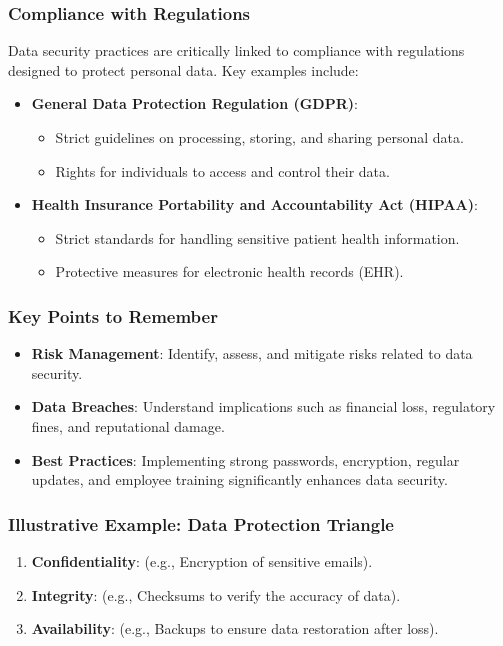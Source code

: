 \documentclass{beamer}
\begin{document}
\begin{frame}[fragile]
    \frametitle{Compliance with Regulations}
    Data security practices are critically linked to compliance with regulations designed to protect personal data. Key examples include:
    \begin{itemize}
        \item \textbf{General Data Protection Regulation (GDPR)}: 
        \begin{itemize}
            \item Strict guidelines on processing, storing, and sharing personal data.
            \item Rights for individuals to access and control their data.
        \end{itemize}
        \item \textbf{Health Insurance Portability and Accountability Act (HIPAA)}: 
        \begin{itemize}
            \item Strict standards for handling sensitive patient health information.
            \item Protective measures for electronic health records (EHR).
        \end{itemize}
    \end{itemize}
\end{frame}

\begin{frame}[fragile]
    \frametitle{Key Points to Remember}
    \begin{itemize}
        \item \textbf{Risk Management}: Identify, assess, and mitigate risks related to data security.
        \item \textbf{Data Breaches}: Understand implications such as financial loss, regulatory fines, and reputational damage.
        \item \textbf{Best Practices}: Implementing strong passwords, encryption, regular updates, and employee training significantly enhances data security.
    \end{itemize}
\end{frame}

\begin{frame}[fragile]
    \frametitle{Illustrative Example: Data Protection Triangle}
    \begin{enumerate}
        \item \textbf{Confidentiality}: (e.g., Encryption of sensitive emails).
        \item \textbf{Integrity}: (e.g., Checksums to verify the accuracy of data).
        \item \textbf{Availability}: (e.g., Backups to ensure data restoration after loss).
    \end{enumerate}
\end{frame}
\end{document}
